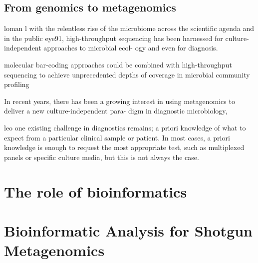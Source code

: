 \subsection{From genomics to metagenomics} \label{ssec:metagenomics}

loman
l with the relentless rise of the microbiome across the scientific agenda
and in the public eye91, high-throughput sequencing has been harnessed for culture- independent approaches to microbial ecol- ogy and even for diagnosis. 

molecular bar-coding approaches could be combined with high-throughput sequencing to achieve unprecedented depths of coverage in microbial community profiling

 In recent years, there has been a growing interest in using metagenomics to deliver a new culture-independent para- digm in diagnostic microbiology, 

leo
one existing challenge in diagnostics remains; a priori knowledge of what to expect from a particular clinical sample or patient. In most cases, a priori knowledge is enough to request the most appropriate test, such as multiplexed panels or specific culture media, but this is not always the case.

\section{The role of bioinformatics}


\section{Bioinformatic Analysis for Shotgun Metagenomics}

